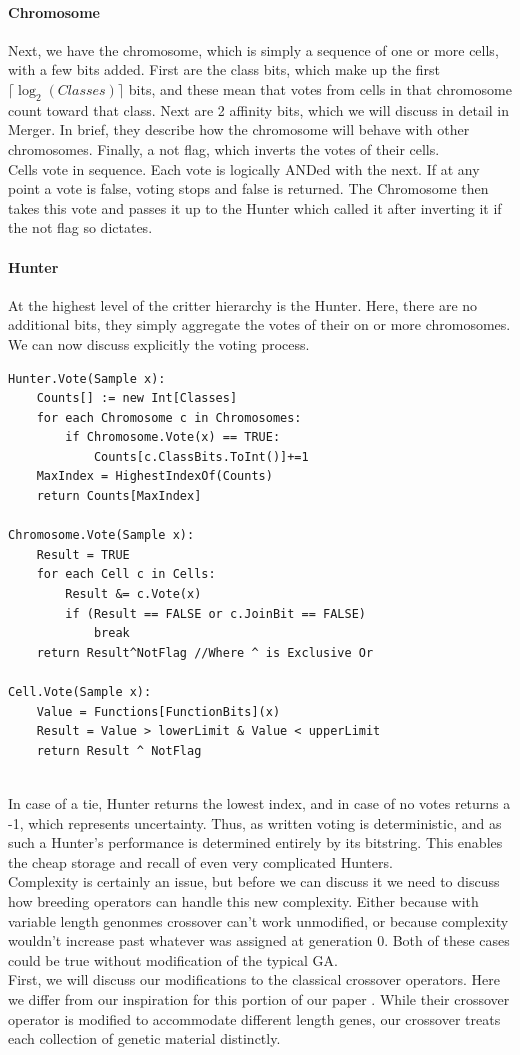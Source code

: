 \paragraph{Chromosome}
Next, we have the chromosome, which is simply a sequence of one or more cells, with a few bits added.  First are the class bits, which make up the first $\lceil \log_2(Classes)\rceil$ bits, and these mean that votes from cells in that chromosome count toward that class.  Next are 2 affinity bits, which we will discuss in detail in Merger.  In brief, they describe how the chromosome will behave with other chromosomes.  Finally, a not flag, which inverts the votes of their cells.\\
Cells vote in sequence.  Each vote is logically ANDed with the next.  If at any point a vote is false, voting stops and false is returned.  The Chromosome then takes this vote and passes it up to the Hunter which called it after inverting it if the not flag so dictates.
\paragraph{Hunter}
At the highest level of the critter hierarchy is the Hunter.  Here, there are no additional bits, they simply aggregate the votes of their on or more chromosomes.  We can now discuss explicitly the voting process.  
\begin{lstlisting}[language = algorithm, caption={Purist Voting Algorithms}, label = {fig:vote}]
Hunter.Vote(Sample x):
	Counts[] := new Int[Classes]
	for each Chromosome c in Chromosomes:
		if Chromosome.Vote(x) == TRUE:
			Counts[c.ClassBits.ToInt()]+=1
	MaxIndex = HighestIndexOf(Counts)
	return Counts[MaxIndex]
	
Chromosome.Vote(Sample x):
	Result = TRUE
	for each Cell c in Cells:
		Result &= c.Vote(x)
		if (Result == FALSE or c.JoinBit == FALSE) 
			break
	return Result^NotFlag //Where ^ is Exclusive Or
	
Cell.Vote(Sample x):
	Value = Functions[FunctionBits](x)
	Result = Value > lowerLimit & Value < upperLimit
	return Result ^ NotFlag
	 
\end{lstlisting}
In case of a tie, Hunter returns the lowest index, and in case of no votes returns a -1, which represents uncertainty.  Thus, as written voting is deterministic, and as such a Hunter's performance is determined entirely by its bitstring.  This enables the cheap storage and recall of even very complicated Hunters.\\
Complexity is certainly an issue, but before we can discuss it we need to discuss how breeding operators can handle this new complexity.  Either because with variable length genonmes crossover can't work unmodified, or because complexity wouldn't increase past whatever was assigned at generation 0.  Both of these cases could be true without modification of the typical GA.\\
First, we will discuss our modifications to the classical crossover operators.  Here we differ from our inspiration for this portion of our paper \citep{kharma_project_2004}.  While their crossover operator is modified to accommodate different length genes, our crossover treats each collection of genetic material distinctly.\\
